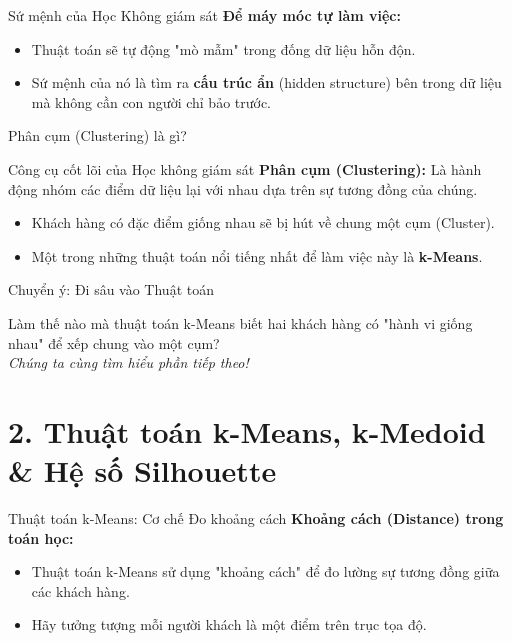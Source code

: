 \documentclass[aspectratio=169]{beamer}
\begin{document}
\begin{frame}{Sứ mệnh của Học Không giám sát}
    \textbf{Để máy móc tự làm việc:}
    \begin{itemize}
        \item Thuật toán sẽ tự động "mò mẫm" trong đống dữ liệu hỗn độn.
        \item Sứ mệnh của nó là tìm ra \textbf{cấu trúc ẩn} (hidden structure) bên trong dữ liệu mà không cần con người chỉ bảo trước.
    \end{itemize}
\end{frame}

\begin{frame}{Phân cụm (Clustering) là gì?}
    \begin{block}{Công cụ cốt lõi của Học không giám sát}
        \textbf{Phân cụm (Clustering):} Là hành động nhóm các điểm dữ liệu lại với nhau dựa trên sự tương đồng của chúng.
        \begin{itemize}
            \item Khách hàng có đặc điểm giống nhau sẽ bị hút về chung một cụm (Cluster).
            \item Một trong những thuật toán nổi tiếng nhất để làm việc này là \textbf{k-Means}.
        \end{itemize}
    \end{block}
\end{frame}

\begin{frame}{Chuyển ý: Đi sâu vào Thuật toán}
    \begin{center}
        \Large Làm thế nào mà thuật toán k-Means biết hai khách hàng có "hành vi giống nhau" để xếp chung vào một cụm?\\
        \vspace{1cm}
        \textit{Chúng ta cùng tìm hiểu phần tiếp theo!}
    \end{center}
\end{frame}

\section{2. Thuật toán k-Means, k-Medoid \& Hệ số Silhouette}

\begin{frame}{Thuật toán k-Means: Cơ chế Đo khoảng cách}
    \textbf{Khoảng cách (Distance) trong toán học:}
    \begin{itemize}
        \item Thuật toán k-Means sử dụng "khoảng cách" để đo lường sự tương đồng giữa các khách hàng.
        \item Hãy tưởng tượng mỗi người khách là một điểm trên trục tọa độ.
    \end{itemize}
\end{frame}
\end{document}
